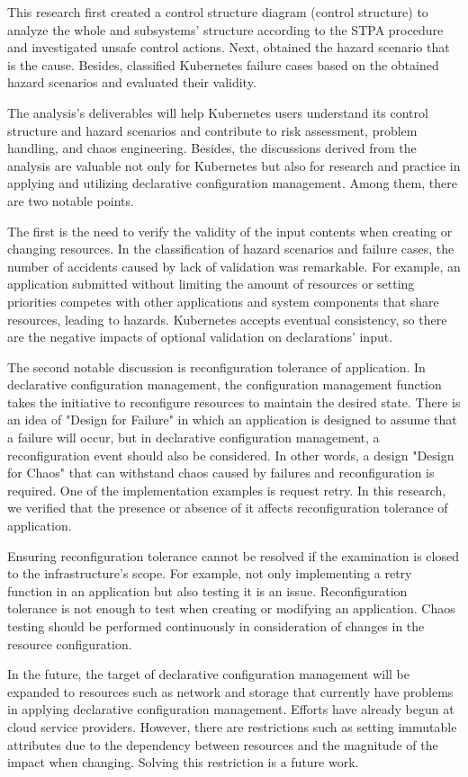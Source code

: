 \documentclass[12pt,a4paper]{article}
\begin{document}
This research first created a control structure diagram (control structure) to analyze the whole and subsystems' structure according to the STPA procedure and investigated unsafe control actions. Next, obtained the hazard scenario that is the cause. Besides, classified Kubernetes failure cases based on the obtained hazard scenarios and evaluated their validity.

The analysis's deliverables will help Kubernetes users understand its control structure and hazard scenarios and contribute to risk assessment, problem handling, and chaos engineering. Besides, the discussions derived from the analysis are valuable not only for Kubernetes but also for research and practice in applying and utilizing declarative configuration management. Among them, there are two notable points.

The first is the need to verify the validity of the input contents when creating or changing resources. In the classification of hazard scenarios and failure cases, the number of accidents caused by lack of validation was remarkable. For example, an application submitted without limiting the amount of resources or setting priorities competes with other applications and system components that share resources, leading to hazards. Kubernetes accepts eventual consistency, so there are the negative impacts of optional validation on declarations' input.

The second notable discussion is reconfiguration tolerance of application. In declarative configuration management, the configuration management function takes the initiative to reconfigure resources to maintain the desired state. There is an idea of "Design for Failure" in which an application is designed to assume that a failure will occur, but in declarative configuration management, a reconfiguration event should also be considered. In other words, a design "Design for Chaos" that can withstand chaos caused by failures and reconfiguration is required. One of the implementation examples is request retry. In this research, we verified that the presence or absence of it affects reconfiguration tolerance of application.

Ensuring reconfiguration tolerance cannot be resolved if the examination is closed to the infrastructure's scope. For example, not only implementing a retry function in an application but also testing it is an issue. Reconfiguration tolerance is not enough to test when creating or modifying an application. Chaos testing should be performed continuously in consideration of changes in the resource configuration.

In the future, the target of declarative configuration management will be expanded to resources such as network and storage that currently have problems in applying declarative configuration management. Efforts have already begun at cloud service providers. However, there are restrictions such as setting immutable attributes due to the dependency between resources and the magnitude of the impact when changing. Solving this restriction is a future work.
\end{document}
